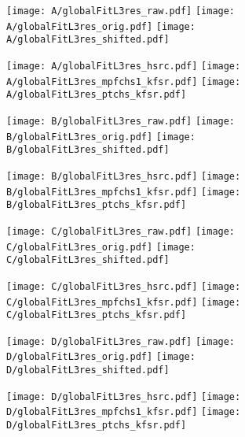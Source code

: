 \documentclass[landscape,10pt]{beamer} %
\begin{document}
\newpage

\begin{figure}[p]
\centering
  \texttt{[image: A/globalFitL3res\_raw.pdf]}
  \texttt{[image: A/globalFitL3res\_orig.pdf]}
  \texttt{[image: A/globalFitL3res\_shifted.pdf]}
\end{figure}
\begin{figure}[p]
\centering
  \texttt{[image: A/globalFitL3res\_hsrc.pdf]}
  \texttt{[image: A/globalFitL3res\_mpfchs1\_kfsr.pdf]}
  \texttt{[image: A/globalFitL3res\_ptchs\_kfsr.pdf]}
\end{figure}

\newpage

\begin{figure}[p]
\centering
  \texttt{[image: B/globalFitL3res\_raw.pdf]}
  \texttt{[image: B/globalFitL3res\_orig.pdf]}
  \texttt{[image: B/globalFitL3res\_shifted.pdf]}
\end{figure}
\begin{figure}[p]
\centering
  \texttt{[image: B/globalFitL3res\_hsrc.pdf]}
  \texttt{[image: B/globalFitL3res\_mpfchs1\_kfsr.pdf]}
  \texttt{[image: B/globalFitL3res\_ptchs\_kfsr.pdf]}
\end{figure}

\newpage

\begin{figure}[p]
\centering
  \texttt{[image: C/globalFitL3res\_raw.pdf]}
  \texttt{[image: C/globalFitL3res\_orig.pdf]}
  \texttt{[image: C/globalFitL3res\_shifted.pdf]}
\end{figure}
\begin{figure}[p]
\centering
  \texttt{[image: C/globalFitL3res\_hsrc.pdf]}
  \texttt{[image: C/globalFitL3res\_mpfchs1\_kfsr.pdf]}
  \texttt{[image: C/globalFitL3res\_ptchs\_kfsr.pdf]}
\end{figure}

\newpage

\begin{figure}[p]
\centering
  \texttt{[image: D/globalFitL3res\_raw.pdf]}
  \texttt{[image: D/globalFitL3res\_orig.pdf]}
  \texttt{[image: D/globalFitL3res\_shifted.pdf]}
\end{figure}
\begin{figure}[p]
\centering
  \texttt{[image: D/globalFitL3res\_hsrc.pdf]}
  \texttt{[image: D/globalFitL3res\_mpfchs1\_kfsr.pdf]}
  \texttt{[image: D/globalFitL3res\_ptchs\_kfsr.pdf]}
\end{figure}
\end{document}
